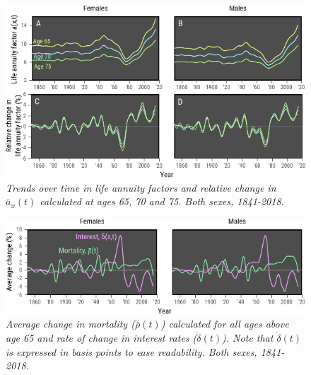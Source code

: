 \documentclass[12pt]{article}
\begin{document}
\begin{figure}[!ht]
	\centering
	\includegraphics[width=1\textwidth]{Fig/FigA1}
	\caption{\textit{Trends over time in life annuity factors and relative change in $\bar{a}_x(t)$ calculated at ages 65, 70 and 75. Both sexes, 1841-2018.}}
	\label{fig:FigA1}
\end{figure}




\begin{figure}[!ht]
	\centering
	\includegraphics[width=1\textwidth]{Fig/FigA2}
	\caption{\textit{Average change in mortality ($\bar{\rho}(t)$) calculated for all ages above age 65 and rate of change in interest rates ($\dot{\delta}(t)$). Note that $\dot{\delta}(t)$ is expressed in basis points to ease readability. Both sexes, 1841-2018.}}
	\label{fig:FigA2}
\end{figure}
\end{document}
